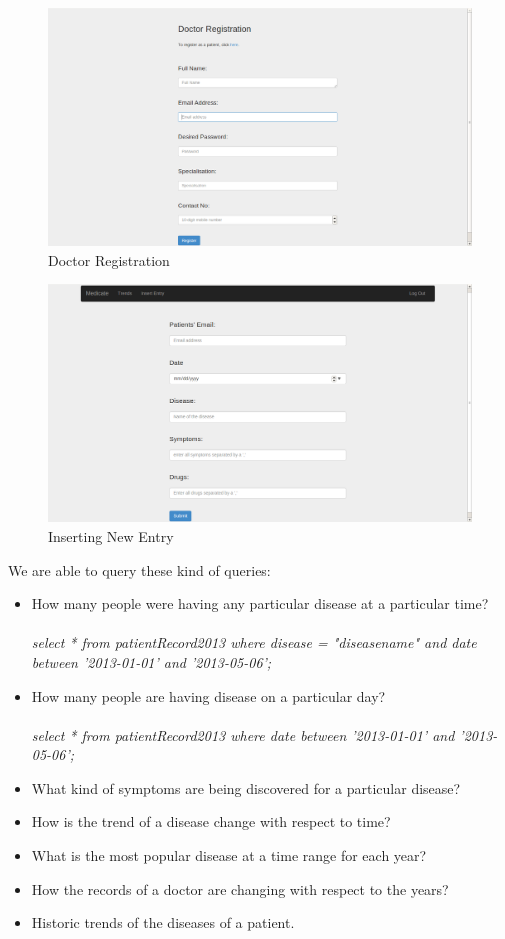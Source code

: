 \documentclass{article}
\begin{document}
\begin{figure}[!htbp]
	\centering
	\includegraphics[width=0.8\columnwidth]{doctor_reg.png}
	\caption{Doctor Registration}
	\label{DR}
\end{figure}

\begin{figure}[!htbp]
	\centering
	\includegraphics[width=0.8\columnwidth]{entry.png}
	\caption{Inserting New Entry}
	\label{entry}
\end{figure}

\newpage
\vspace{1in}
We are able to query these kind of queries:
\begin{itemize}
\item How many people were having any particular disease at a particular time?\\\\
\textit{select * from patientRecord2013 where disease = "diseasename" and date between '2013-01-01' and '2013-05-06';}
\item How many people are having disease on a particular day?\\\\
\textit{select * from patientRecord2013 where date between '2013-01-01' and '2013-05-06';}
\item What kind of symptoms are being discovered for a particular disease?
\item How is the trend of a disease change with respect to time?
\item What is the most popular disease at a time range for each year?
\item How the records of a doctor are changing with respect to the years?
\item Historic trends of the diseases of a patient.
\end{itemize}
\newpage
\end{document}
